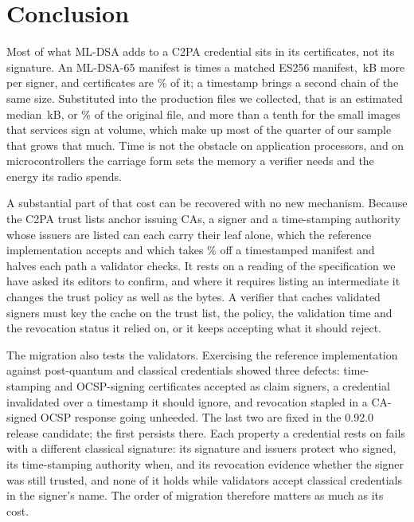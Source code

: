 \section{Conclusion}
\label{sec:conclusion}

Most of what ML-DSA adds to a C2PA credential sits in its certificates, not
its signature. An ML-DSA-65 manifest is \NvsESDSAsixtyfive{} times a
matched ES256 manifest, \NdeltaESDSAsixtyfive\,kB more per signer, and
certificates are \NchainShareManDSAsixtyfive\% of it; a timestamp brings a
second chain of the same size. Substituted into the production files we
collected, that is an estimated median \NcpqAddMedkB\,kB, or \NcpqPctMed\% of
the original file, and more than a tenth for the small images that services
sign at volume, which make up most of the quarter of our sample that grows
that much. Time is not the obstacle on application processors, and on
microcontrollers the carriage form sets the memory a verifier needs and the
energy its radio spends.

A substantial part of that cost can be recovered with no new mechanism.
Because the C2PA trust lists anchor issuing CAs, a signer and a time-stamping
authority whose issuers are listed can each carry their leaf alone, which the
reference implementation accepts and which takes \NtsBothLeafPct\% off a
timestamped manifest and halves each path a validator checks. It rests on a
reading of the specification we have asked its editors to confirm, and where it
requires listing an intermediate it changes the trust policy as well as the
bytes. A verifier that caches validated signers must key the cache on the
trust list, the policy, the validation time and the revocation status it
relied on, or it keeps accepting what it should reject.

The migration also tests the validators. Exercising the reference
implementation against post-quantum and classical credentials showed three
defects: time-stamping and OCSP-signing certificates accepted as claim
signers, a credential invalidated over a timestamp it should ignore, and
revocation stapled in a CA-signed OCSP response going unheeded. The last two
are fixed in the 0.92.0 release candidate; the first persists there. Each property a credential rests on
fails with a different classical signature: its signature and issuers protect
who signed,
its time-stamping authority when, and its revocation evidence whether the
signer was still trusted, and none of it holds while validators accept
classical credentials in the signer's name. The order of migration therefore
matters as much as its cost.
